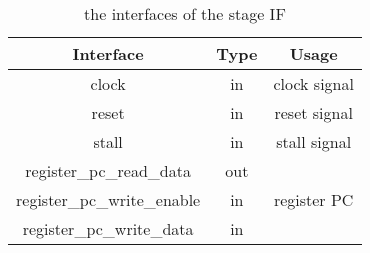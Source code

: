 \begin{table}[!h]
\centering
\begin{tabular}{|c|c|c|}
\hline
Interface & Type & Usage \\ \hline
clock & in & clock signal \\ \hline
reset & in & reset signal \\ \hline
stall & in & stall signal \\ \hline
register\_pc\_read\_data & out & \multirow{3}{*}{register PC} \\ \cline{1-2}
register\_pc\_write\_enable & in &  \\ \cline{1-2}
register\_pc\_write\_data & in &  \\ \hline
\end{tabular}
\caption{the interfaces of the stage IF}
\end{table}